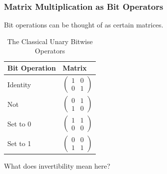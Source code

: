 \documentclass{beamer}
\begin{document}
\begin{frame}
\frametitle{Matrix Multiplication as Bit Operators}
Bit operations can be thought of
as certain matrices.

\begin{table}
\begin{tabular}{l l}
\toprule
\textbf{Bit Operation} & \textbf{Matrix}\\
\midrule
Identity & $\begin{pmatrix}1 & 0 \\ 0 & 1\end{pmatrix}$ \\
Not & $\begin{pmatrix}0 & 1 \\ 1 & 0\end{pmatrix}$\\
Set to 0 & $\begin{pmatrix}1 & 1 \\ 0 & 0\end{pmatrix}$\\
Set to 1 & $\begin{pmatrix}0 & 0 \\ 1 & 1\end{pmatrix}$\\
\bottomrule
\end{tabular}
\caption{The Classical Unary Bitwise Operators}
\end{table}

What does invertibility mean here?

\end{frame}
\end{document}
